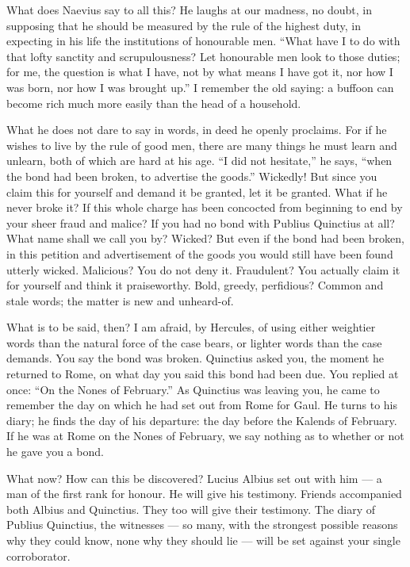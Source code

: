  What does Naevius say to all this? He laughs at our madness, no doubt, in supposing that he should be measured by the rule of the highest duty, in expecting in his life the institutions of honourable men. ``What have I to do with that lofty sanctity and scrupulousness? Let honourable men look to those duties; for me, the question is what I have, not by what means I have got it, nor how I was born, nor how I was brought up.'' I remember the old saying: a buffoon can become rich much more easily than the head of a household.

 What he does not dare to say in words, in deed he openly proclaims. For if he wishes to live by the rule of good men, there are many things he must learn and unlearn, both of which are hard at his age. ``I did not hesitate,'' he says, ``when the bond had been broken, to advertise the goods.'' Wickedly! But since you claim this for yourself and demand it be granted, let it be granted. What if he never broke it? If this whole charge has been concocted from beginning to end by your sheer fraud and malice? If you had no bond with Publius Quinctius at all? What name shall we call you by? Wicked? But even if the bond had been broken, in this petition and advertisement of the goods you would still have been found utterly wicked. Malicious? You do not deny it. Fraudulent? You actually claim it for yourself and think it praiseworthy. Bold, greedy, perfidious? Common and stale words; the matter is new and unheard-of.

 What is to be said, then? I am afraid, by Hercules, of using either weightier words than the natural force of the case bears, or lighter words than the case demands. You say the bond was broken. Quinctius asked you, the moment he returned to Rome, on what day you said this bond had been due. You replied at once: ``On the Nones of February.'' As Quinctius was leaving you, he came to remember the day on which he had set out from Rome for Gaul. He turns to his diary; he finds the day of his departure: the day before the Kalends of February. If he was at Rome on the Nones of February, we say nothing as to whether or not he gave you a bond.

 What now? How can this be discovered? Lucius Albius set out with him --- a man of the first rank for honour. He will give his testimony. Friends accompanied both Albius and Quinctius. They too will give their testimony. The diary of Publius Quinctius, the witnesses --- so many, with the strongest possible reasons why they could know, none why they should lie --- will be set against your single corroborator.

